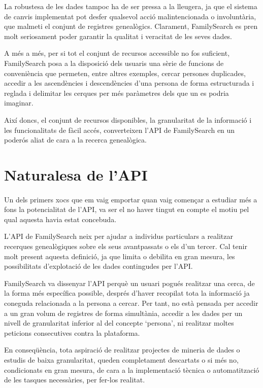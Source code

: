     La robustesa de les dades tampoc ha de ser pressa a la lleugera, ja que el sistema de canvis implementat pot desfer qualsevol acció malintencionada o involuntària, que malmeti el conjunt de registres genealògics. Clarament, FamilySearch es pren molt seriosament poder garantir la qualitat i veracitat de les seves dades.

    A més a més, per si tot el conjunt de recursos accessible no fos suficient, Family\-Search posa a la disposició dels usuaris una sèrie de funcions de conveniència que permeten, entre altres exemples, cercar persones duplicades, accedir a les ascendències i descendències d'una persona de forma estructurada i reglada i delimitar les cerques per més paràmetres dels que un es podria imaginar.

    Així doncs, el conjunt de recursos disponibles, la granularitat de la informació i les funcionalitats de fàcil accés, converteixen l'API de FamilySearch en un poderós aliat de cara a la recerca genealògica.


\section{Naturalesa de l'API}

    \paragraph{}
    Un dels primers xocs que em vaig emportar quan vaig començar a estudiar més a fons la potencialitat de l'API, va ser el no haver tingut en compte el motiu pel qual aquesta havia estat concebuda.

    L'API de FamilySearch neix per ajudar a individus particulars a realitzar recerques genealògiques sobre els seus avantpassats o els d'un tercer. Cal tenir molt present aquesta definició, ja que limita o debilita en gran mesura, les possibilitats d'explotació de les dades contingudes per l'API.

    FamilySearch va dissenyar l'API perquè un usuari pogués realitzar una cerca, de la forma més específica possible, després d'haver recopilat tota la informació ja coneguda relacionada a la persona a cercar. Per tant, no està pensada per accedir a un gran volum de registres de forma simultània, accedir a les dades per un ni\-vell de granularitat inferior al del concepte `persona', ni realitzar moltes peticions consecutives contra la plataforma.

    En conseqüència, tota aspiració de realitzar projectes de mineria de dades o estudis de baixa granularitat, queden completament descartats o si més no, condicionats en gran mesura, de cara a la implementació tècnica o automatització de les tasques necessàries, per fer-los realitat.


